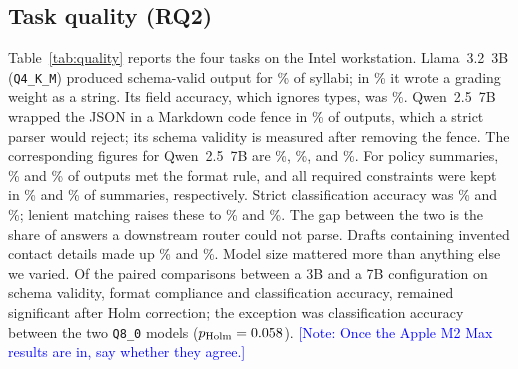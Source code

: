 \documentclass[sigconf,nonacm]{acmart}
\newcommand{\todonote}[1]{\textcolor{blue}{\textsf{[Note: #1]}}}
\newcommand{\todonote}[1]{\errmessage{Author note left in final build: #1}}
\newcommand{\fitbox}[2]{\sbox{\fitboxbox}{#2}%
  \ifdim\wd\fitboxbox>#1\resizebox{#1}{!}{\usebox{\fitboxbox}}\else\usebox{\fitboxbox}\fi}
\begin{document}
\subsection{Task quality (RQ2)}
Table~\ref{tab:quality} reports the four tasks on the Intel workstation.
Llama~3.2~3B (\texttt{Q4\_K\_M}) produced schema-valid output for \SchemaLlamaQfour\% of syllabi; in \TypeErrLlamaQfour\% it wrote a grading weight as a string.
Its field accuracy, which ignores types, was \FieldAccLlamaQfour\%.
Qwen~2.5~7B wrapped the JSON in a Markdown code fence in \WrapQwenQfour\% of outputs, which a strict parser would reject; its schema validity is measured after removing the fence.
The corresponding figures for Qwen~2.5~7B are \SchemaQwenQfour\%, \TypeErrQwenQfour\%, and \FieldAccQwenQfour\%.
For policy summaries, \FormatLlamaQfour\% and \FormatQwenQfour\% of outputs met the format rule, and all required constraints were kept in \AllRetainLlamaQfour\% and \AllRetainQwenQfour\% of summaries, respectively.
Strict classification accuracy was \AccLlamaQfour\% and \AccQwenQfour\%; lenient matching raises these to \AccLenientLlamaQfour\% and \AccLenientQwenQfour\%.
The gap between the two is the share of answers a downstream router could not parse.
Drafts containing invented contact details made up \InventedLlamaQfour\% and \InventedQwenQfour\%.
Model size mattered more than anything else we varied.
Of the \NSizeTests{} paired comparisons between a 3B and a 7B configuration on schema validity, format compliance and classification accuracy, \NSizeSig{} remained significant after Holm correction; the exception was classification accuracy between the two \texttt{Q8\_0} models ($p_{\text{Holm}}=0.058$).
\todonote{Once the Apple M2 Max results are in, say whether they agree.}

\begin{table}[t]
\caption{Task quality on the Intel workstation, $T=0$. Brackets are 95\% Wilson intervals. Str.~wt.: share of extractions with a grading weight written as a string. Constr.: mean share of required constraints retained.}
\label{tab:quality}
\small
\fitbox{\textwidth}{}
\end{table}

\begin{table}[t]
\caption{Reference-based summary metrics (secondary).}
\label{tab:reference}
\small
\fitbox{\columnwidth}{}
\end{table}
\end{document}
